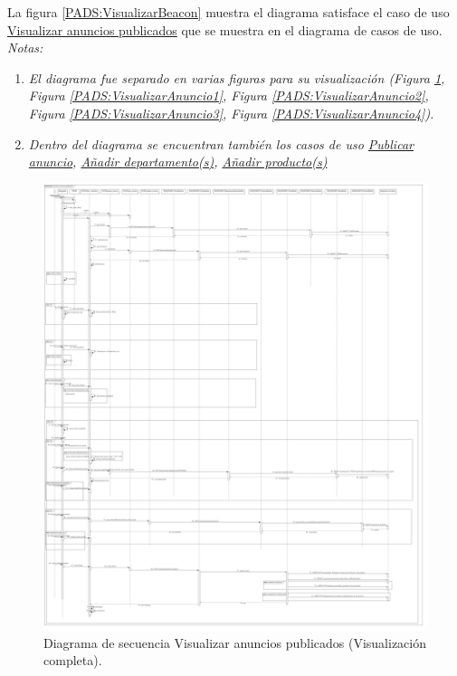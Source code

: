 La figura \ref{PADS:VisualizarBeacon} muestra el diagrama satisface el caso de uso \hyperlink{casosdeusoPA}{Visualizar anuncios publicados} que se muestra en el diagrama de casos de uso. \\
\textit{Notas:}
\begin{enumerate}
\item \textit{El diagrama fue separado en varias figuras para su visualización (Figura \ref{PADS:VisualizarAnuncio}, Figura \ref{PADS:VisualizarAnuncio1}, Figura \ref{PADS:VisualizarAnuncio2}, Figura \ref{PADS:VisualizarAnuncio3}, Figura \ref{PADS:VisualizarAnuncio4}).}
\item \textit{Dentro del diagrama se encuentran también los casos de uso \hyperlink{casosdeusoPA}{Publicar anuncio}, \hyperlink{casosdeusoPA}{Añadir departamento(s)}, \hyperlink{casosdeusoPA}{Añadir producto(s)}} 
\end{enumerate}
\FloatBarrier
\begin{figure}[htbp!]
		\centering
			\includegraphics[width=1 \textwidth]{imagenes/DSRuben/anuncios}
		\caption{Diagrama de secuencia Visualizar anuncios publicados (Visualización completa).}
		\label{PADS:VisualizarAnuncio}
\end{figure}
\FloatBarrier

